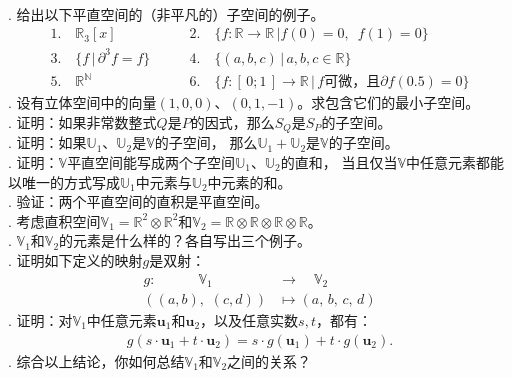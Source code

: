 \documentclass[12pt,UTF8]{ctexbook}
\begin{document}
\begin{xt}
    \mbox{} \\
    . 给出以下平直空间的（非平凡的）子空间的例子。
    $$
    \begin{array}{ll}
        1. \quad \mathbb{R}_3[x] & \qquad 2. \quad \{f: \mathbb{R} \rightarrow \mathbb{R} \, | f(0) = 0, \,\,\, f(1) = 0\} \\
        3. \quad \{f \, | \, \partial^3 f = f\} & \qquad 4. \quad \{(a, b, c) \, | \, a, b, c \in \mathbb{R}\} \\
        5. \quad \mathbb{R}^\mathbb{N} & \qquad 6. \quad \{f: [\,0;1\,] \rightarrow \mathbb{R} \, | \, f \mbox{可微，且} \partial f(0.5) = 0\}
    \end{array}
    $$
    . 设有立体空间中的向量$(1, 0, 0)$、$(0, 1, -1)$。求包含它们的最小子空间。\\
    . 证明：如果非常数整式$Q$是$P$的因式，那么$S_Q$是$S_P$的子空间。\\
    . 证明：如果$\mathbb{U}_1$、$\mathbb{U}_2$是$\mathbb{V}$的子空间，
    那么$\mathbb{U}_1 + \mathbb{U}_2$是$\mathbb{V}$的子空间。\\
    . 证明：$\mathbb{V}$平直空间能写成两个子空间$\mathbb{U}_1$、$\mathbb{U}_2$的直和，
    当且仅当$\mathbb{V}$中任意元素都能以唯一的方式写成$\mathbb{U}_1$中元素与$\mathbb{U}_2$中元素的和。\\
    . 验证：两个平直空间的直积是平直空间。\\
    . 考虑直积空间$\mathbb{V}_1 = \mathbb{R}^2\otimes \mathbb{R}^2$和$\mathbb{V}_2 = \mathbb{R}\otimes \mathbb{R}\otimes \mathbb{R}\otimes \mathbb{R}$。\\
    . $\mathbb{V}_1$和$\mathbb{V}_2$的元素是什么样的？各自写出三个例子。\\
    . 证明如下定义的映射$g$是双射：
    \begin{align*}
        g:\quad \qquad \mathbb{V}_1 \qquad &\rightarrow \quad \mathbb{V}_2 \\
        ((a,b), \,\, (c,d)) &\mapsto (a, \,b, \,c, \,d)
    \end{align*}
    . 证明：对$\mathbb{V}_1$中任意元素$\mathbf{u}_1$和$\mathbf{u}_2$，以及任意实数$s, t$，都有：
    \begin{align*}
        g(s\cdot \mathbf{u}_1 + t\cdot \mathbf{u}_2) = s\cdot g(\mathbf{u}_1) + t\cdot g(\mathbf{u}_2).
    \end{align*}
    . 综合以上结论，你如何总结$\mathbb{V}_1$和$\mathbb{V}_2$之间的关系？\\
\end{xt}
\end{document}
